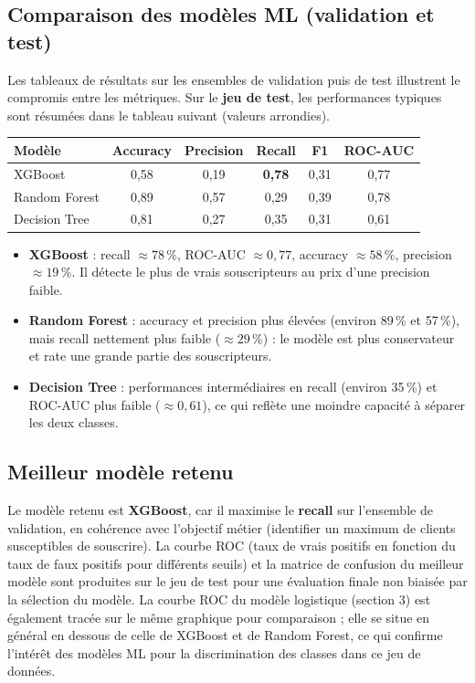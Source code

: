 \documentclass[11pt,a4paper]{article}
\begin{document}
\subsection{Comparaison des modèles ML (validation et test)}
Les tableaux de résultats sur les ensembles de validation puis de test illustrent le compromis entre les métriques. Sur le \textbf{jeu de test}, les performances typiques sont résumées dans le tableau suivant (valeurs arrondies).

\begin{center}
\begin{tabular}{lccccc}
\toprule
Modèle & Accuracy & Precision & Recall & F1 & ROC-AUC \\
\midrule
XGBoost & 0,58 & 0,19 & \textbf{0,78} & 0,31 & 0,77 \\
Random Forest & 0,89 & 0,57 & 0,29 & 0,39 & 0,78 \\
Decision Tree & 0,81 & 0,27 & 0,35 & 0,31 & 0,61 \\
\bottomrule
\end{tabular}
\end{center}

\begin{itemize}
  \item \textbf{XGBoost} : recall $\approx 78\,\%$, ROC-AUC $\approx 0{,}77$, accuracy $\approx 58\,\%$, precision $\approx 19\,\%$. Il détecte le plus de vrais souscripteurs au prix d'une precision faible.
  \item \textbf{Random Forest} : accuracy et precision plus élevées (environ 89\,\% et 57\,\%), mais recall nettement plus faible ($\approx 29\,\%$) : le modèle est plus conservateur et rate une grande partie des souscripteurs.
  \item \textbf{Decision Tree} : performances intermédiaires en recall (environ 35\,\%) et ROC-AUC plus faible ($\approx 0{,}61$), ce qui reflète une moindre capacité à séparer les deux classes.
\end{itemize}

\subsection{Meilleur modèle retenu}
Le modèle retenu est \textbf{XGBoost}, car il maximise le \textbf{recall} sur l'ensemble de validation, en cohérence avec l'objectif métier (identifier un maximum de clients susceptibles de souscrire). La courbe ROC (taux de vrais positifs en fonction du taux de faux positifs pour différents seuils) et la matrice de confusion du meilleur modèle sont produites sur le jeu de test pour une évaluation finale non biaisée par la sélection du modèle. La courbe ROC du modèle logistique (section 3) est également tracée sur le même graphique pour comparaison ; elle se situe en général en dessous de celle de XGBoost et de Random Forest, ce qui confirme l'intérêt des modèles ML pour la discrimination des classes dans ce jeu de données.
\end{document}
